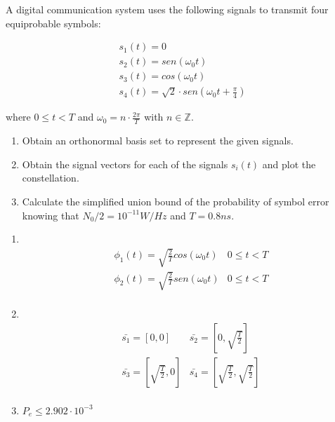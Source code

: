 \documentclass[es,boletin]{uah}
\begin{document}
{

	A digital communication system uses the following signals to transmit four equiprobable symbols:
	
	\begin{displaymath}
		\begin{array}{l}
			s_1(t) = 0 \\
			s_2(t) = sen \left ( \omega_0 t \right ) \\
			s_3(t) = cos \left ( \omega_0 t \right ) \\
			s_4(t) = \sqrt{2} \cdot sen \left ( \omega_0 t + \frac{\pi}{4} \right )
		\end{array}
	\end{displaymath}
	
	where $0 \leq t < T$ and $\omega_0 = n \cdot \frac{2\pi}{T}$ with $n \in \mathbb{Z}$.

	\begin{enumerate}
		\item Obtain an orthonormal basis set to represent the given signals.
		\item Obtain the signal vectors for each of the signals $s_i(t)$ and plot the constellation.
		\item Calculate the simplified union bound of the probability of symbol error knowing that $N_0/2=10^{-11} W/Hz$ and $T=0.8 ns$.
	\end{enumerate}
	
}
{

\begin{enumerate}
	\item \
	\begin{displaymath}
		\begin{array}{ll}
			\phi_1(t) = \sqrt{\frac{2}{T}} cos \left ( \omega_0 t  \right ) & 0 \leq t < T \\
			\phi_2(t) = \sqrt{\frac{2}{T}} sen \left ( \omega_0 t  \right ) & 0 \leq t < T \\
		\end{array}
	\end{displaymath}
	\item \
	\begin{displaymath}
		\begin{array}{ll}
			\bar{s_1} = \left [0, 0 \right ] & \bar{s_2} = \left [0, \sqrt{\frac{T}{2}} \right ] \\
			\bar{s_3} = \left [\sqrt{\frac{T}{2}}, 0 \right ] & \bar{s_4} = \left [\sqrt{\frac{T}{2}}, \sqrt{\frac{T}{2}} \right ]\\
		\end{array}
	\end{displaymath}
	\item $P_e \leq 2.902 \cdot 10^{-3}$
\end{enumerate}
}
\end{document}
